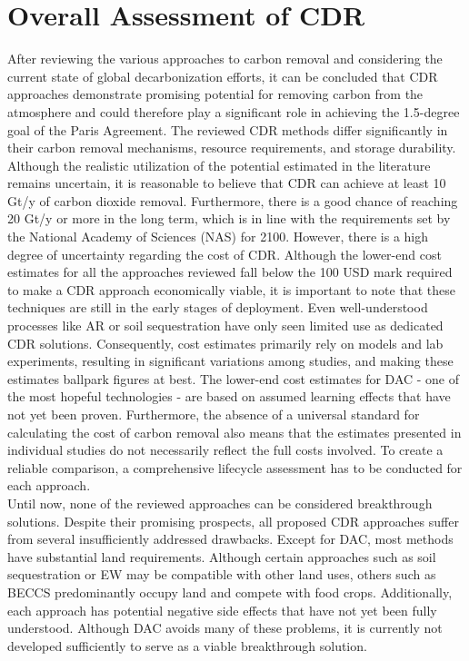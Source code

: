 \section{Overall Assessment of CDR}
After reviewing the various approaches to carbon removal and considering the current state of global decarbonization efforts, it can be concluded that CDR approaches demonstrate promising potential for removing carbon from the atmosphere and could therefore play a significant role in achieving the 1.5-degree goal of the Paris Agreement. The reviewed CDR methods differ significantly in their carbon removal mechanisms, resource requirements, and storage durability. Although the realistic utilization of the potential estimated in the literature remains uncertain, it is reasonable to believe that CDR can achieve at least 10 Gt/y of carbon dioxide removal. Furthermore, there is a good chance of reaching 20 Gt/y or more in the long term, which is in line with the requirements set by the National Academy of Sciences (NAS) for 2100. However, there is a high degree of uncertainty regarding the cost of CDR. Although the lower-end cost estimates for all the approaches reviewed fall below the 100 USD mark required to make a CDR approach economically viable, it is important to note that these techniques are still in the early stages of deployment. Even well-understood processes like AR or soil sequestration have only seen limited use as dedicated CDR solutions. Consequently, cost estimates primarily rely on models and lab experiments, resulting in significant variations among studies, and making these estimates ballpark figures at best. The lower-end cost estimates for DAC - one of the most hopeful technologies - are based on assumed learning effects that have not yet been proven. Furthermore, the absence of a universal standard for calculating the cost of carbon removal also means that the estimates presented in individual studies do not necessarily reflect the full costs involved. To create a reliable comparison, a comprehensive lifecycle assessment has to be conducted for each approach.\\
Until now, none of the reviewed approaches can be considered breakthrough solutions. Despite their promising prospects, all proposed CDR approaches suffer from several insufficiently addressed drawbacks. Except for DAC, most methods have substantial land requirements. Although certain approaches such as soil sequestration or EW may be compatible with other land uses, others such as BECCS predominantly occupy land and compete with food crops. Additionally, each approach has potential negative side effects that have not yet been fully understood. Although DAC avoids many of these problems, it is currently not developed sufficiently to serve as a viable breakthrough solution.\\
